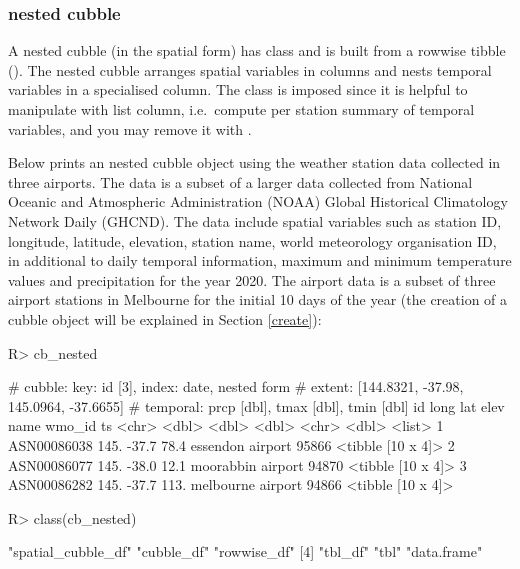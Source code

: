 \documentclass[
  shortnames]{jss}
\begin{document}
\hypertarget{nested-cubble}{%
\subsubsection{nested cubble}\label{nested-cubble}}

A nested cubble (in the spatial form) has class  and is built from a rowwise tibble (). The nested cubble arranges spatial variables in columns and nests temporal variables in a specialised  column. The  class is imposed since it is helpful to manipulate with list column, i.e.~compute per station summary of temporal variables, and you may remove it with .

Below prints an nested cubble object using the weather station data collected in three airports. The data is a subset of a larger data  collected from National Oceanic and Atmospheric Administration (NOAA) Global Historical Climatology Network Daily (GHCND). The data include spatial variables such as station ID, longitude, latitude, elevation, station name, world meteorology organisation ID, in additional to daily temporal information, maximum and minimum temperature values and precipitation for the year 2020. The airport data is a subset of three airport stations in Melbourne for the initial 10 days of the year (the creation of a cubble object will be explained in Section \ref{create}):

\begin{CodeChunk}
\begin{CodeInput}
R> cb_nested
\end{CodeInput}
\begin{CodeOutput}
# cubble:   key: id [3], index: date, nested form
# extent:   [144.8321, -37.98, 145.0964, -37.6655]
# temporal: prcp [dbl], tmax [dbl], tmin [dbl]
  id           long   lat  elev name              wmo_id ts               
  <chr>       <dbl> <dbl> <dbl> <chr>              <dbl> <list>           
1 ASN00086038  145. -37.7  78.4 essendon airport   95866 <tibble [10 x 4]>
2 ASN00086077  145. -38.0  12.1 moorabbin airport  94870 <tibble [10 x 4]>
3 ASN00086282  145. -37.7 113.  melbourne airport  94866 <tibble [10 x 4]>
\end{CodeOutput}
\begin{CodeInput}
R> class(cb_nested)
\end{CodeInput}
\begin{CodeOutput}
[1] "spatial_cubble_df" "cubble_df"         "rowwise_df"       
[4] "tbl_df"            "tbl"               "data.frame"       
\end{CodeOutput}
\end{CodeChunk}
\end{document}
